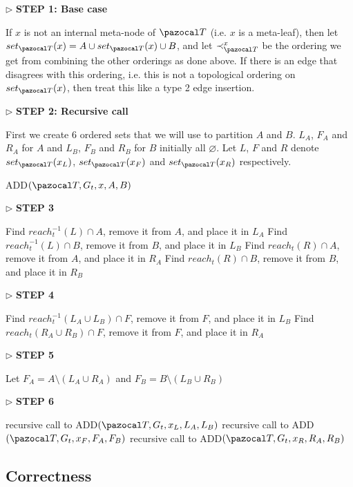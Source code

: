 \documentclass{report}
\begin{document}
\begin{algorithm}[H]\label{ADD}
    \SetAlgoLined
    $\triangleright$ \textbf{STEP 1: Base case}
    
    If $x$ is not an internal meta-node of $\pazocal T$ (i.e. $x$ is a meta-leaf), then let $set_{\pazocal T}(x)=A\cup set_{\pazocal T}(x)\cup B$, and let $\prec_{\pazocal T}^{x}$ be the ordering we get from combining the other orderings as done above. If there is an edge that disagrees with this ordering, i.e. this is not a topological ordering on $set_{\pazocal T}(x)$, then treat this like a type 2 edge insertion.
    
    $\triangleright$ \textbf{STEP 2: Recursive call}
    
    First we create 6 ordered sets that we will use to partition $A$ and $B$. $L_{A}$, $F_{A}$ and $R_{A}$ for $A$ and $L_{B}$, $F_{B}$ and $R_{B}$ for $B$ initially all $\varnothing$. Let $L$, $F$ and $R$ denote $set_{\pazocal T}(x_{L})$, $set_{\pazocal T}(x_{F})$ and $set_{\pazocal T}(x_{R})$ respectively.
    \caption{ADD$(\pazocal T,G_t,x,A,B)$}
    
    $\triangleright$ \textbf{STEP 3}
    
    Find $reach_{t}^{-1}(L) \cap A$, remove it from $A$, and place it in $L_{A}$\;
    Find $reach_{t}^{-1}(L) \cap B$, remove it from $B$, and place it in $L_{B}$\;
    Find $reach_{t}(R) \cap A$, remove it from $A$, and place it in $R_{A}$\;
    Find $reach_{t}(R) \cap B$, remove it from $B$, and place it in $R_{B}$\;
    
    $\triangleright$ \textbf{STEP 4}
    
    Find $reach_{t}^{-1}(L_{A} \cup L_{B}) \cap F$, remove it from $F$, and place it in $L_{B}$\;
    Find $reach_{t}(R_{A} \cup R_{B}) \cap F$, remove it from $F$, and place it in $R_{A}$\;
    
    $\triangleright$ \textbf{STEP 5}
    
    Let $F_{A}=A \setminus (L_{A} \cup R_{A})$ and $F_{B}=B \setminus (L_{B} \cup R_{B})$\;
    
    $\triangleright$ \textbf{STEP 6}
    
    recursive call to ADD$(\pazocal T, G_t, x_{L},L_{A},L_{B})$\;
    recursive call to ADD$(\pazocal T,G_t, x_{F},F_{A},F_{B})$\;
    recursive call to ADD$(\pazocal T,G_t, x_{R},R_{A},R_{B})$\;
\end{algorithm}

\subsection{Correctness}
\end{document}
